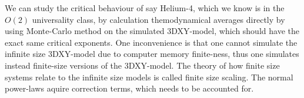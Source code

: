 We can study the critical behaviour of say Helium-4, which we know is in the $O(2)$ universality class, by calculation themodynamical averages directly by using Monte-Carlo method on the simulated 3DXY-model, which should have the exact same critical exponents. 
One inconvenience is that one cannot simulate the infinite size 3DXY-model due to computer memory finite-ness, thus one simulates instead finite-size versions of the 3DXY-model. The theory of how finite size systems relate to the infinite size models is called finite size scaling. The normal power-laws aquire correction terms, which needs to be accounted for.
